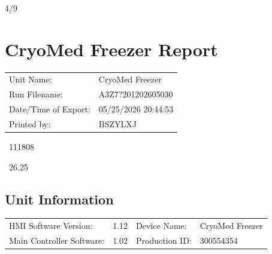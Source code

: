 \documentclass[UTF8,10pt,a4paper,fontset=fandol]{ctexart}
\newcommand{\fieldvalue}[1]{#1}
\newcommand{\handwritten}[1]{#1}
\begin{document}
\begin{flushright}
\handwritten{4/9}
\end{flushright}

\newpage

\section*{CryoMed Freezer Report}

\begin{tabularx}{\textwidth}{@{}lX@{}}
Unit Name: &
\fieldvalue{CryoMed Freezer} \\

Run Filename: &
\fieldvalue{A3Z7?201202605030} \\

Date/Time of Export: &
\fieldvalue{05/25/2026 20:44:53} \\

Printed by: &
\fieldvalue{BSZYLXJ}
\end{tabularx}

\handwritten{~111808}

\handwritten{~26.25}

\subsection*{Unit Information}

\begin{tabularx}{\textwidth}{@{}lX@{\quad}lX@{}}
HMI Software Version: &
\fieldvalue{1.12} &
Device Name: &
\fieldvalue{CryoMed Freezer} \\

Main Controller Software: &
\fieldvalue{1.02} &
Production ID: &
\fieldvalue{300554354}
\end{tabularx}
\end{document}
